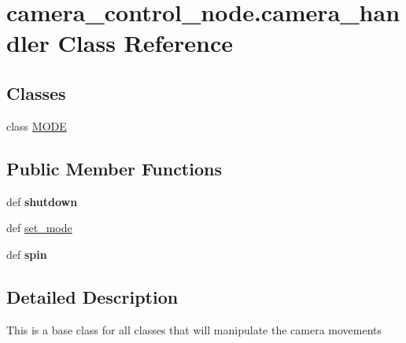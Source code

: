 \hypertarget{classcamera__control__node_1_1camera__handler}{\section{camera\-\_\-control\-\_\-node.\-camera\-\_\-handler Class Reference}
\label{classcamera__control__node_1_1camera__handler}
}
\subsection*{Classes}
\begin{DoxyCompactItemize}
\item 
class \hyperlink{classcamera__control__node_1_1camera__handler_1_1MODE}{M\-O\-D\-E}
\end{DoxyCompactItemize}
\subsection*{Public Member Functions}
\begin{DoxyCompactItemize}
\item 
\hypertarget{classcamera__control__node_1_1camera__handler_ae452c44a8c0e689606f1e5dea85e0d56}{def {\bfseries shutdown}}\label{classcamera__control__node_1_1camera__handler_ae452c44a8c0e689606f1e5dea85e0d56}

\item 
def \hyperlink{classcamera__control__node_1_1camera__handler_afa833b2713fe4f470835876daaefcac4}{set\-\_\-mode}
\item 
\hypertarget{classcamera__control__node_1_1camera__handler_a8fb595b002e82e3cbfe8b56bd56b2eac}{def {\bfseries spin}}\label{classcamera__control__node_1_1camera__handler_a8fb595b002e82e3cbfe8b56bd56b2eac}

\end{DoxyCompactItemize}


\subsection{Detailed Description}
\begin{DoxyVerb}    This is a base class for all classes that will manipulate the camera movements
\end{DoxyVerb}
 


